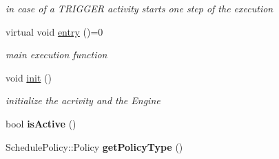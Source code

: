 \begin{DoxyCompactItemize}
\begin{DoxyCompactList}\small\item\em in case of a T\-R\-I\-G\-G\-E\-R activity starts one step of the execution \end{DoxyCompactList}\item 
\hypertarget{classcoco_1_1_activity_a8a1182e9e8649223df1e0ec4e3648395}{virtual void \hyperlink{classcoco_1_1_activity_a8a1182e9e8649223df1e0ec4e3648395}{entry} ()=0}\label{classcoco_1_1_activity_a8a1182e9e8649223df1e0ec4e3648395}

\begin{DoxyCompactList}\small\item\em main execution function \end{DoxyCompactList}\item 
\hypertarget{classcoco_1_1_activity_a99600e19dc7279629e291c821e98d522}{void \hyperlink{classcoco_1_1_activity_a99600e19dc7279629e291c821e98d522}{init} ()}\label{classcoco_1_1_activity_a99600e19dc7279629e291c821e98d522}

\begin{DoxyCompactList}\small\item\em initialize the acrivity and the Engine \end{DoxyCompactList}\item 
\hypertarget{classcoco_1_1_activity_aca34cad2b6211a66efe5bbdf4db5aa44}{bool {\bfseries is\-Active} ()}\label{classcoco_1_1_activity_aca34cad2b6211a66efe5bbdf4db5aa44}

\item 
\hypertarget{classcoco_1_1_activity_a9c2f3c05e3416e4617496de06c83a00b}{Schedule\-Policy\-::\-Policy {\bfseries get\-Policy\-Type} ()}\label{classcoco_1_1_activity_a9c2f3c05e3416e4617496de06c83a00b}

\end{DoxyCompactItemize}
